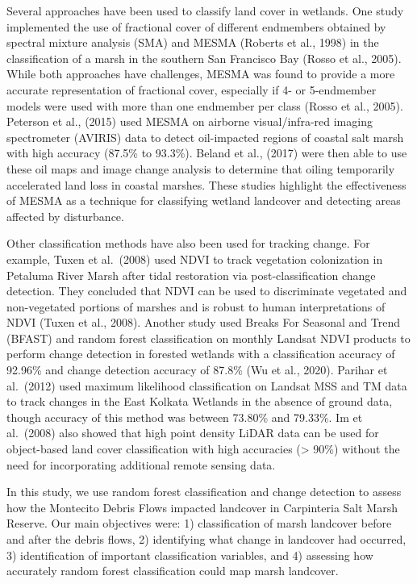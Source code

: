 \documentclass[
]{article}
\begin{document}
Several approaches have been used to classify land cover in wetlands.
One study implemented the use of fractional cover of different
endmembers obtained by spectral mixture analysis (SMA) and MESMA
(Roberts et al., 1998) in the classification of a marsh in the southern
San Francisco Bay (Rosso et al., 2005). While both approaches have
challenges, MESMA was found to provide a more accurate representation of
fractional cover, especially if 4- or 5-endmember models were used with
more than one endmember per class (Rosso et al., 2005). Peterson et al.,
(2015) used MESMA on airborne visual/infra-red imaging spectrometer
(AVIRIS) data to detect oil-impacted regions of coastal salt marsh with
high accuracy (87.5\% to 93.3\%). Beland et al., (2017) were then able
to use these oil maps and image change analysis to determine that oiling
temporarily accelerated land loss in coastal marshes. These studies
highlight the effectiveness of MESMA as a technique for classifying
wetland landcover and detecting areas affected by disturbance.

Other classification methods have also been used for tracking change.
For example, Tuxen et al.~(2008) used NDVI to track vegetation
colonization in Petaluma River Marsh after tidal restoration via
post-classification change detection. They concluded that NDVI can be
used to discriminate vegetated and non-vegetated portions of marshes and
is robust to human interpretations of NDVI (Tuxen et al., 2008). Another
study used Breaks For Seasonal and Trend (BFAST) and random forest
classification on monthly Landsat NDVI products to perform change
detection in forested wetlands with a classification accuracy of 92.96\%
and change detection accuracy of 87.8\% (Wu et al., 2020). Parihar et
al.~(2012) used maximum likelihood classification on Landsat MSS and TM
data to track changes in the East Kolkata Wetlands in the absence of
ground data, though accuracy of this method was between 73.80\% and
79.33\%. Im et al.~(2008) also showed that high point density LiDAR data
can be used for object-based land cover classification with high
accuracies (\textgreater{} 90\%) without the need for incorporating
additional remote sensing data.

In this study, we use random forest classification and change detection
to assess how the Montecito Debris Flows impacted landcover in
Carpinteria Salt Marsh Reserve. Our main objectives were: 1)
classification of marsh landcover before and after the debris flows, 2)
identifying what change in landcover had occurred, 3) identification of
important classification variables, and 4) assessing how accurately
random forest classification could map marsh landcover.
\end{document}
